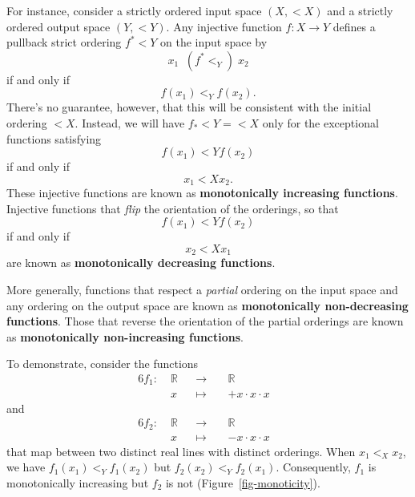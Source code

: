 \documentclass[
  letterpaper,
  DIV=11,
  numbers=noendperiod]{scrartcl}
\begin{document}
For instance, consider a strictly ordered input space \((X, <{X})\) and
a strictly ordered output space \((Y, <{Y})\). Any injective function
\(f: X \rightarrow Y\) defines a pullback strict ordering
\(f^{*} \!\! <{Y}\) on the input space by \[
x_{1} \;\; (f^{*}\!\!<_{Y}) \; x_{2}
\] if and only if \[
f(x_{1}) <_{Y} f(x_{2}).
\] There's no guarantee, however, that this will be consistent with the
initial ordering \(<{X}\). Instead, we will have \(f_{*} <{Y} = <{X}\)
only for the exceptional functions satisfying \[
f(x_{1}) <{Y} f(x_{2})
\] if and only if \[
x_{1} <{X} x_{2}.
\] These injective functions are known as \textbf{monotonically
increasing functions}. Injective functions that \emph{flip} the
orientation of the orderings, so that \[
f(x_{1}) <{Y} f(x_{2})
\] if and only if \[
x_{2} <{X} x_{1}
\] are known as \textbf{monotonically decreasing functions}.

More generally, functions that respect a \emph{partial} ordering on the
input space and any ordering on the output space are known as
\textbf{monotonically non-decreasing functions}. Those that reverse the
orientation of the partial orderings are known as \textbf{monotonically
non-increasing functions}.

To demonstrate, consider the functions \begin{alignat*}{6}
f_1 :\; & \mathbb{R} & &\rightarrow& \; & \mathbb{R} &
\\
& x & &\mapsto& & + x \cdot x \cdot x &
\end{alignat*} and \begin{alignat*}{6}
f_2 :\; & \mathbb{R} & &\rightarrow& \; & \mathbb{R} &
\\
& x & &\mapsto& & - x \cdot x \cdot x &
\end{alignat*} that map between two distinct real lines with distinct
orderings. When \(x_{1} <_{X} x_{2}\), we have
\(f_1(x_{1}) <_{Y} f_1(x_{2})\) but \(f_2(x_{2}) <_{Y} f_2(x_{1})\).
Consequently, \(f_1\) is monotonically increasing but \(f_2\) is not
(Figure~\ref{fig-monoticity}).
\end{document}
